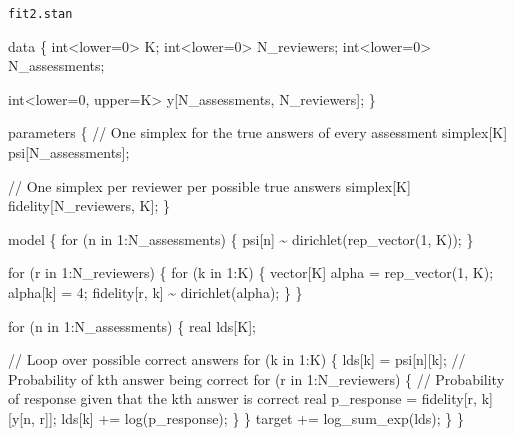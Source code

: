 \documentclass[
  letterpaper,
  DIV=11,
  numbers=noendperiod]{scrartcl}
\newenvironment{Shaded}{\begin{snugshade}}{\end{snugshade}}
\newcommand{\CommentTok}[1]{\textcolor[rgb]{0.37,0.37,0.37}{#1}}
\newcommand{\ControlFlowTok}[1]{\textcolor[rgb]{0.00,0.23,0.31}{#1}}
\newcommand{\DataTypeTok}[1]{\textcolor[rgb]{0.68,0.00,0.00}{#1}}
\newcommand{\DecValTok}[1]{\textcolor[rgb]{0.68,0.00,0.00}{#1}}
\newcommand{\KeywordTok}[1]{\textcolor[rgb]{0.00,0.23,0.31}{#1}}
\newcommand{\NormalTok}[1]{\textcolor[rgb]{0.00,0.23,0.31}{#1}}
\begin{document}
\begin{codelisting}

\caption{\texttt{fit2.stan}}

\begin{Shaded}
\begin{Highlighting}[]
\KeywordTok{data}\NormalTok{ \{}
  \DataTypeTok{int}\NormalTok{\textless{}}\KeywordTok{lower}\NormalTok{=}\DecValTok{0}\NormalTok{\textgreater{} K;}
  \DataTypeTok{int}\NormalTok{\textless{}}\KeywordTok{lower}\NormalTok{=}\DecValTok{0}\NormalTok{\textgreater{} N\_reviewers;}
  \DataTypeTok{int}\NormalTok{\textless{}}\KeywordTok{lower}\NormalTok{=}\DecValTok{0}\NormalTok{\textgreater{} N\_assessments;}

  \DataTypeTok{int}\NormalTok{\textless{}}\KeywordTok{lower}\NormalTok{=}\DecValTok{0}\NormalTok{, }\KeywordTok{upper}\NormalTok{=K\textgreater{} y[N\_assessments, N\_reviewers];}
\NormalTok{\}}

\KeywordTok{parameters}\NormalTok{ \{}
  \CommentTok{// One simplex for the true answers of every assessment}
  \DataTypeTok{simplex}\NormalTok{[K] psi[N\_assessments];}
  
  \CommentTok{// One simplex per reviewer per possible true answers}
  \DataTypeTok{simplex}\NormalTok{[K] fidelity[N\_reviewers, K];}
\NormalTok{\}}

\KeywordTok{model}\NormalTok{ \{}
  \ControlFlowTok{for}\NormalTok{ (n }\ControlFlowTok{in} \DecValTok{1}\NormalTok{:N\_assessments) \{}
\NormalTok{    psi[n] \textasciitilde{} dirichlet(rep\_vector(}\DecValTok{1}\NormalTok{, K));}
\NormalTok{  \}}
  
  \ControlFlowTok{for}\NormalTok{ (r }\ControlFlowTok{in} \DecValTok{1}\NormalTok{:N\_reviewers) \{}
    \ControlFlowTok{for}\NormalTok{ (k }\ControlFlowTok{in} \DecValTok{1}\NormalTok{:K) \{}
      \DataTypeTok{vector}\NormalTok{[K] alpha = rep\_vector(}\DecValTok{1}\NormalTok{, K);}
\NormalTok{      alpha[k] = }\DecValTok{4}\NormalTok{;}
\NormalTok{      fidelity[r, k] \textasciitilde{} dirichlet(alpha);}
\NormalTok{    \}}
\NormalTok{  \}}
  
  \ControlFlowTok{for}\NormalTok{ (n }\ControlFlowTok{in} \DecValTok{1}\NormalTok{:N\_assessments) \{}
    \DataTypeTok{real}\NormalTok{ lds[K];}
    
    \CommentTok{// Loop over possible correct answers}
    \ControlFlowTok{for}\NormalTok{ (k }\ControlFlowTok{in} \DecValTok{1}\NormalTok{:K) \{}
\NormalTok{      lds[k] = psi[n][k]; }\CommentTok{// Probability of kth answer being correct }
      \ControlFlowTok{for}\NormalTok{ (r }\ControlFlowTok{in} \DecValTok{1}\NormalTok{:N\_reviewers) \{}
        \CommentTok{// Probability of response given that the kth answer is correct}
        \DataTypeTok{real}\NormalTok{ p\_response = fidelity[r, k][y[n, r]];}
\NormalTok{        lds[k] += log(p\_response);}
\NormalTok{      \}}
\NormalTok{    \}}
    \KeywordTok{target +=}\NormalTok{ log\_sum\_exp(lds);}
\NormalTok{  \}}
\NormalTok{\}}


\end{Highlighting}
\end{Shaded}
\end{codelisting}
\end{document}
